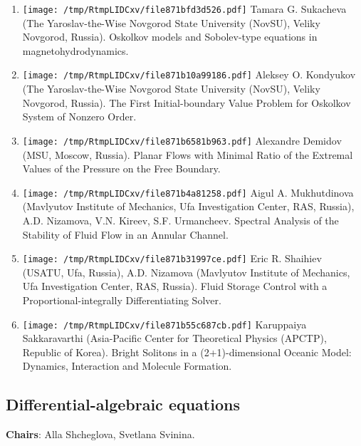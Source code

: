 \documentclass[
]{article}
\providecommand{\tightlist}{%
  \setlength{\itemsep}{0pt}\setlength{\parskip}{0pt}}
\begin{document}
\begin{enumerate}
\def\labelenumi{\arabic{enumi}.}
\tightlist
\item
  \protect\texttt{[image: /tmp/RtmpLIDCxv/file871bfd3d526.pdf]}
  Tamara G. Sukacheva (The Yaroslav-the-Wise Novgorod State University
  (NovSU), Veliky Novgorod, Russia). Oskolkov models and Sobolev-type
  equations in magnetohydrodynamics.
\item
  \protect\texttt{[image: /tmp/RtmpLIDCxv/file871b10a99186.pdf]}
  Aleksey O. Kondyukov (The Yaroslav-the-Wise Novgorod State University
  (NovSU), Veliky Novgorod, Russia). The First Initial-boundary Value
  Problem for Oskolkov System of Nonzero Order.
\item
  \protect\texttt{[image: /tmp/RtmpLIDCxv/file871b6581b963.pdf]}
  Alexandre Demidov (MSU, Moscow, Russia). Planar Flows with Minimal
  Ratio of the Extremal Values of the Pressure on the Free Boundary.
\item
  \protect\texttt{[image: /tmp/RtmpLIDCxv/file871b4a81258.pdf]}
  Aigul A. Mukhutdinova (Mavlyutov Institute of Mechanics, Ufa
  Investigation Center, RAS, Russia), A.D. Nizamova, V.N. Kireev, S.F.
  Urmancheev. Spectral Analysis of the Stability of Fluid Flow in an
  Annular Channel.
\item
  \protect\texttt{[image: /tmp/RtmpLIDCxv/file871b31997ce.pdf]}
  Eric R. Shaihiev (USATU, Ufa, Russia), A.D. Nizamova (Mavlyutov
  Institute of Mechanics, Ufa Investigation Center, RAS, Russia). Fluid
  Storage Control with a Proportional-integrally Differentiating Solver.
\item
  \protect\texttt{[image: /tmp/RtmpLIDCxv/file871b55c687cb.pdf]}
  Karuppaiya Sakkaravarthi (Asia-Pacific Center for Theoretical Physics
  (APCTP), Republic of Korea). Bright Solitons in a (2+1)-dimensional
  Oceanic Model: Dynamics, Interaction and Molecule Formation.
\end{enumerate}

\hypertarget{dae}{%
\subsection{Differential-algebraic equations}\label{dae}}

\textbf{Chairs}: Alla Shcheglova, Svetlana Svinina.
\end{document}
